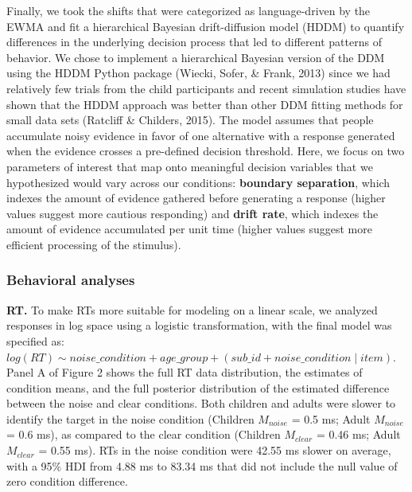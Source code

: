 \documentclass[10pt, letterpaper]{article}
\begin{document}
Finally, we took the shifts that were categorized as language-driven by
the EWMA and fit a hierarchical Bayesian drift-diffusion model (HDDM) to
quantify differences in the underlying decision process that led to
different patterns of behavior. We chose to implement a hierarchical
Bayesian version of the DDM using the HDDM Python package (Wiecki,
Sofer, \& Frank, 2013) since we had relatively few trials from the child
participants and recent simulation studies have shown that the HDDM
approach was better than other DDM fitting methods for small data sets
(Ratcliff \& Childers, 2015). The model assumes that people accumulate
noisy evidence in favor of one alternative with a response generated
when the evidence crosses a pre-defined decision threshold. Here, we
focus on two parameters of interest that map onto meaningful decision
variables that we hypothesized would vary across our conditions:
\textbf{boundary separation}, which indexes the amount of evidence
gathered before generating a response (higher values suggest more
cautious responding) and \textbf{drift rate}, which indexes the amount
of evidence accumulated per unit time (higher values suggest more
efficient processing of the stimulus).

\subsubsection{Behavioral analyses}\label{behavioral-analyses}

\textbf{RT.} To make RTs more suitable for modeling on a linear scale,
we analyzed responses in log space using a logistic transformation, with
the final model was specified as:
\texttt{$log(RT) \sim noise\_condition + age\_group + (sub\_id + noise\_condition \mid item)$}.
Panel A of Figure 2 shows the full RT data distribution, the estimates
of condition means, and the full posterior distribution of the estimated
difference between the noise and clear conditions. Both children and
adults were slower to identify the target in the noise condition
(Children \(M_{noise}\) = 0.5 ms; Adult \(M_{noise}\) = 0.6 ms), as
compared to the clear condition (Children \(M_{clear}\) = 0.46 ms; Adult
\(M_{clear}\) = 0.55 ms). RTs in the noise condition were 42.55 ms
slower on average, with a 95\% HDI from 4.88 ms to 83.34 ms that did not
include the null value of zero condition difference.
\end{document}
